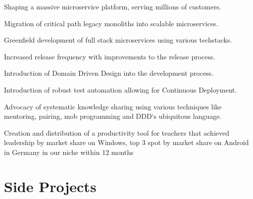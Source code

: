 \documentclass[]{resume}
\begin{document}
\begin{minipage}[t]{0.64\textwidth}
\begin{tightemize}
\item Shaping a massive microservice platform, serving millions of customers.
\item Migration of critical path legacy monoliths into scalable microservices.
\item Greenfield development of full stack microservices using various techstacks.
\item Increased release frequency with improvements to the release process.
\item Introduction of Domain Driven Design into the development process.
\item Introduction of robust test automation allowing for Continuous Deployment.
\item Advocacy of systematic knowledge sharing using various techniques like mentoring, pairing, mob programming and DDD`s ubiquitous language.
\end{tightemize}
\sectionsep

\vspace{\topsep} %
Creation and distribution of a productivity tool for teachers that achieved leadership by market share on Windows, top 3 spot by market share on Android in Germany in our niche within 12 months
\sectionsep

\sectionsep



\section{Side Projects}

\sectionsep

\sectionsep

\end{minipage} 
\end{document}
